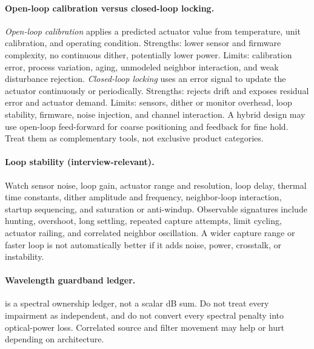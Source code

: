\paragraph{Open-loop calibration versus closed-loop locking.}
\emph{Open-loop calibration} applies a predicted actuator value from temperature,
unit calibration, and operating condition. Strengths: lower sensor and firmware
complexity, no continuous dither, potentially lower power. Limits: calibration
error, process variation, aging, unmodeled neighbor interaction, and weak
disturbance rejection. \emph{Closed-loop locking} uses an error signal to update
the actuator continuously or periodically. Strengths: rejects drift and exposes
residual error and actuator demand. Limits: sensors, dither or monitor overhead,
loop stability, firmware, noise injection, and channel interaction. A hybrid
design may use open-loop feed-forward for coarse positioning and feedback for
fine hold. Treat them as complementary tools, not exclusive product categories.

\paragraph{Loop stability (interview-relevant).}
Watch sensor noise, loop gain, actuator range and resolution, loop delay, thermal
time constants, dither amplitude and frequency, neighbor-loop interaction,
startup sequencing, and saturation or anti-windup. Observable signatures include
hunting, overshoot, long settling, repeated capture attempts, limit cycling,
actuator railing, and correlated neighbor oscillation. A wider capture range or
faster loop is not automatically better if it adds noise, power, crosstalk, or
instability.

\paragraph{Wavelength guardband ledger.}
 is a spectral ownership ledger, not a scalar dB sum.
Do not treat every impairment as independent, and do not convert every spectral
penalty into optical-power loss. Correlated source and filter movement may help
or hurt depending on architecture.

